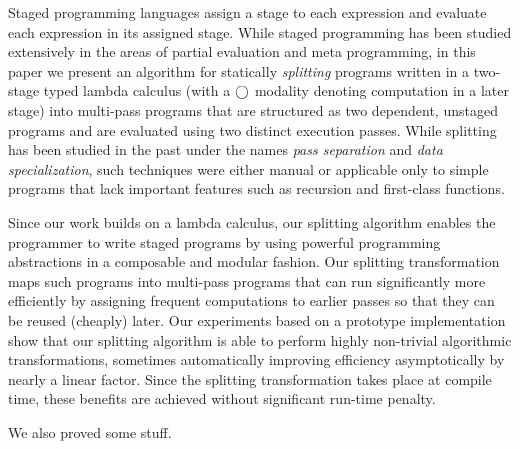 Staged programming languages assign a stage to each expression and
evaluate each expression in its assigned stage.
While staged programming has been studied extensively in the areas of
partial evaluation and meta programming, in this paper we present an
algorithm for statically {\em splitting} programs written in a
two-stage typed lambda calculus (with a $\bigcirc$ modality denoting
computation in a later stage) into multi-pass programs that are
structured as two dependent, unstaged programs and are evaluated using
two distinct execution passes.  While splitting has been studied in the past
under the names \emph{pass separation} and \emph{data specialization},
such techniques were either manual or applicable only to simple programs
that lack important features such as recursion and first-class
functions.

Since our work builds on a lambda calculus, our splitting algorithm
enables the programmer to write staged programs by using powerful
programming abstractions in a composable and modular fashion. Our
splitting transformation maps such programs into multi-pass programs
that can run significantly more efficiently by assigning frequent
computations to earlier passes so that they can be reused (cheaply)
later.  Our experiments based on a prototype implementation show that
our splitting algorithm is able to perform highly non-trivial algorithmic
transformations, sometimes automatically improving efficiency
asymptotically by nearly a linear factor.  Since the splitting
transformation takes place at compile time, these benefits are
achieved without significant run-time penalty.

\TODO We also proved some stuff.





